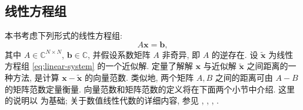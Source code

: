 \subsection{{线性方程组}}\label{sec:linear-systems}
{本书考虑下列形式的线性方程组:}
\begin{equation}\label{eq:linear-system}
A\bm x=\bm b,
\end{equation}
{其中 $A\in\mathbb C^{N\times N}$, $\bm b\in\mathbb C$, 并假设系数矩阵 $A$ 非奇异, 即 $A$ 的逆存在.}
{设 $\tilde{\bm x}$ 为线性方程组 \eqref{eq:linear-system} 的一个近似解. 定量了解解 $\bm x$ 与近似解 $\tilde{\bm x}$ 之间距离的一种方法, 是计算 $\bm x-\tilde{\bm x}$ 的向量范数. 类似地, 两个矩阵 $A,B$ 之间的距离可由 $A-B$ 的矩阵范数定量衡量. 向量范数和矩阵范数的定义将在下面两个小节中介绍. 这里的说明以  为基础; 关于数值线性代数的详细内容, 参见 , , , .}
